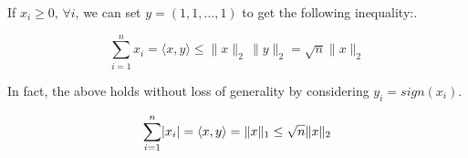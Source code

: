 \documentclass[paper=A4, fontsize=11pt]{scrartcl}
\let\originalleft\left
\let\originalright\right
\renewcommand{\left}{\mathopen{}\mathclose\bgroup\originalleft}
\renewcommand{\right}{\aftergroup\egroup\originalright}
\theoremstyle{remark}
\begin{document}
If $x_i \geq 0, \, \forall i$, we can set $y= (1, 1, ..., 1)$ to get the following inequality:.

\begin{equation}
\sum_{i=1}^{n} x_{i} = \langle x,y\rangle  \leq  \|x\|_{2}\, \|y\|_{2} = \sqrt{n}\|x\|_{2}
\end{equation}

In fact, the above holds without loss of generality by considering $y_{i} = sign(x_{i})$. 

\begin{equation}
\sum_{i=1}^{n} \left|x_{i}\right| = \langle x,y\rangle =  \|x\|_{1}\leq \sqrt{n}\|x\|_{2}
\end{equation}	

\end{document}
